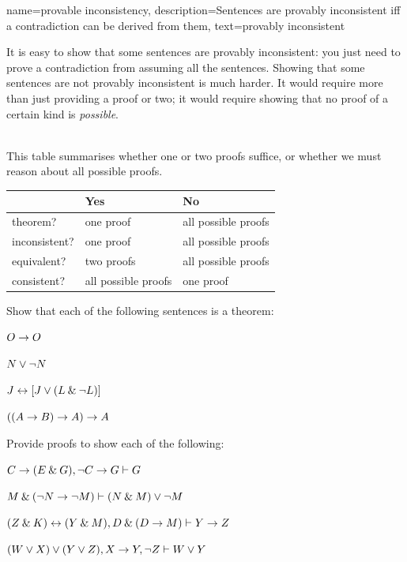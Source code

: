 {    name={provable inconsistency}, 
  description={Sentences are provably inconsistent iff a contradiction can be derived from them},
    text={provably inconsistent}
}

It is easy to show that some sentences are provably inconsistent: you just need to prove a contradiction from assuming all the sentences. Showing that some sentences are not provably inconsistent is much harder. It would require more than just providing a proof or two; it would require showing that no proof of a certain kind is \emph{possible}.

\
\\
This table summarises whether one or two proofs suffice, or whether we must reason about all possible proofs.

\begin{center}
\begin{tabular}{l l l}
 & \textbf{Yes} & \textbf{No}\\
 \hline
theorem? & one proof & all possible proofs\\
inconsistent? &  one proof  & all possible proofs\\
equivalent? & two proofs & all possible proofs\\
consistent? & all possible proofs & one proof\\
\end{tabular}
\end{center}


\practiceproblems
\problempart
Show that each of the following sentences is a theorem:
\begin{earg}
\item $O \rightarrow O$
\item $N \vee {\neg} N$
\item $J \leftrightarrow [J\vee (L\mathbin{\&}{\neg} L)]$
\item $((A \rightarrow B) \rightarrow A) \rightarrow A$ 
\end{earg}

\problempart
Provide proofs to show each of the following:
\begin{earg}
\item $C\rightarrow(E\mathbin{\&} G), {\neg} C \rightarrow G \vdash G$
\item $M \mathbin{\&} ({\neg} N \rightarrow {\neg} M) \vdash (N \mathbin{\&} M) \vee {\neg} M$
\item $(Z\mathbin{\&} K)\leftrightarrow(Y\mathbin{\&} M), D\mathbin{\&}(D\rightarrow M) \vdash Y\rightarrow Z$
\item $(W \vee X) \vee (Y \vee Z), X\rightarrow Y, {\neg} Z \vdash W\vee Y$
\end{earg}


